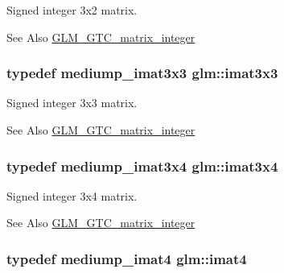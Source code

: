 Signed integer 3x2 matrix. \begin{DoxySeeAlso}{See Also}
\hyperlink{group__gtc__matrix__integer}{G\-L\-M\-\_\-\-G\-T\-C\-\_\-matrix\-\_\-integer} 
\end{DoxySeeAlso}
\hypertarget{group__gtc__matrix__integer_gaeff9ef8f56cccc828d6b897923e75402}{
\subsubsection[{imat3x3}]{\setlength{\rightskip}{0pt plus 5cm}typedef mediump\-\_\-imat3x3 {\bf glm\-::imat3x3}}}\label{group__gtc__matrix__integer_gaeff9ef8f56cccc828d6b897923e75402}
Signed integer 3x3 matrix. \begin{DoxySeeAlso}{See Also}
\hyperlink{group__gtc__matrix__integer}{G\-L\-M\-\_\-\-G\-T\-C\-\_\-matrix\-\_\-integer} 
\end{DoxySeeAlso}
\hypertarget{group__gtc__matrix__integer_gaee5507e6cbbdd05841a0c174e60dd036}{
\subsubsection[{imat3x4}]{\setlength{\rightskip}{0pt plus 5cm}typedef mediump\-\_\-imat3x4 {\bf glm\-::imat3x4}}}\label{group__gtc__matrix__integer_gaee5507e6cbbdd05841a0c174e60dd036}
Signed integer 3x4 matrix. \begin{DoxySeeAlso}{See Also}
\hyperlink{group__gtc__matrix__integer}{G\-L\-M\-\_\-\-G\-T\-C\-\_\-matrix\-\_\-integer} 
\end{DoxySeeAlso}
\hypertarget{group__gtc__matrix__integer_ga40fc5c5e0b07543497aa1c314891544a}{
\subsubsection[{imat4}]{\setlength{\rightskip}{0pt plus 5cm}typedef mediump\-\_\-imat4 {\bf glm\-::imat4}}}\label{group__gtc__matrix__integer_ga40fc5c5e0b07543497aa1c314891544a}
